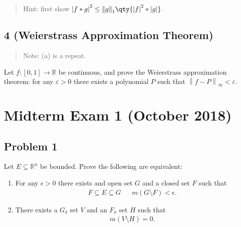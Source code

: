 \begin{quote}
Hint: first show
\({\left\lvert {f\ast g} \right\rvert}^2 \leq {\left\lVert {g} \right\rVert}_1 \qty{ {\left\lvert {f} \right\rvert}^2 \ast {\left\lvert {g} \right\rvert}}\).
\end{quote}

\hypertarget{weierstrass-approximation-theorem}{%
\subsection{4 (Weierstrass Approximation
Theorem)}\label{weierstrass-approximation-theorem}}

\begin{quote}
Note: (a) is a repeat.
\end{quote}

Let \(f: [0, 1]\to {\mathbb{R}}\) be continuous, and prove the
Weierstrass approximation theorem: for any \({\varepsilon}> 0\) there
exists a polynomial \(P\) such that
\({\left\lVert {f - P} \right\rVert}_{\infty} < {\varepsilon}\).

\hypertarget{midterm-exam-1-october-2018}{%
\section{Midterm Exam 1 (October
2018)}\label{midterm-exam-1-october-2018}}

\hypertarget{problem-1}{%
\subsection{Problem 1}\label{problem-1}}

\label{equivalence_of_approximating_measures} Let
\(E \subseteq {\mathbb{R}}^n\) be bounded. Prove the following are
equivalent:

\begin{enumerate}
\def\labelenumi{\arabic{enumi}.}
\item
  For any \(\epsilon>0\) there exists and open set \(G\) and a closed
  set \(F\) such that
  \begin{align*}
  F \subseteq E \subseteq G && m(G\setminus F) < \epsilon
  .\end{align*}
\item
  There exists a \(G_ \delta\) set \(V\) and an \(F_ \sigma\) set \(H\)
  such that
  \begin{align*}
  m(V\setminus H) = 0
  .\end{align*}
\end{enumerate}

